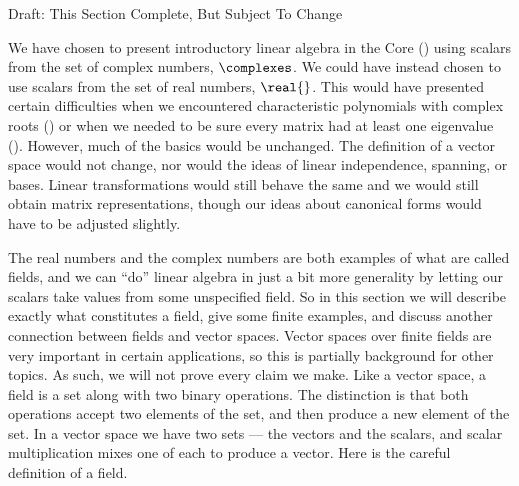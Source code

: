 %
{\sc\large Draft: This Section Complete, But Subject To Change}\par\bigskip
%
We have chosen to present introductory linear algebra in the Core () using scalars from the set of complex numbers, $\complexes$.  We could have instead chosen to use scalars from the set of real numbers, $\real{\null}$.  This would have presented certain difficulties when we encountered characteristic polynomials with complex roots () or when we needed to be sure every matrix had at least one eigenvalue ().  However, much of the basics would be unchanged.  The definition of a vector space would not change, nor would the ideas of linear independence, spanning, or bases.  Linear transformations would still behave the same and we would still obtain matrix representations, though our ideas about canonical forms would have to be adjusted slightly.\par
%
The real numbers and the complex numbers are both examples of what are called fields, and we can ``do'' linear algebra in just a bit more generality by letting our scalars take values from some unspecified field.  So in this section we will describe exactly what constitutes a field, give some finite examples, and discuss another connection between fields and vector spaces.   Vector spaces over finite fields are very important in certain applications, so this is partially background for other topics.  As such, we will not prove every claim we make.
%
%
Like a vector space, a field is a set along with two binary operations.  The distinction is that both operations accept two elements of the set, and then produce a new element of the set.  In a vector space we have two sets --- the vectors and the scalars, and scalar multiplication mixes one of each to produce a vector.  Here is the careful definition of a field.
%
